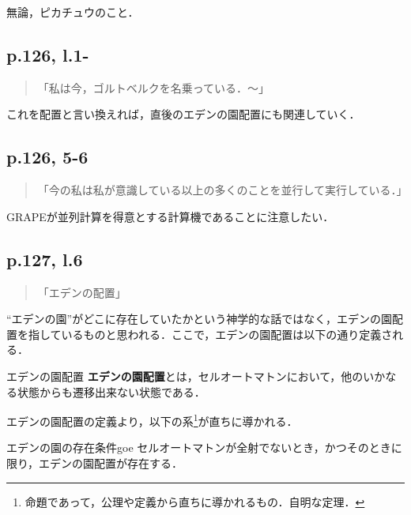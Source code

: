\documentclass[10pt, a5paper, twoside]{ltjsarticle}
\begin{document}
            無論，ピカチュウのこと．

        \subsection{p.126, l.1-}

            \begin{quote}
                「私は今，ゴルトベルクを名乗っている．〜」
            \end{quote}

            これを配置と言い換えれば，直後のエデンの園配置にも関連していく．

        \subsection{p.126, 5-6}

            \begin{quote}
                「今の私は私が意識している以上の多くのことを並行して実行している．」
            \end{quote}

            GRAPEが並列計算を得意とする計算機であることに注意したい．

        \subsection{p.127, l.6}\label{eden}

            \begin{quote}
                「エデンの配置」
            \end{quote}

            “エデンの園”がどこに存在していたかという神学的な話ではなく，エデンの園配置を指しているものと思われる．ここで，エデンの園配置は以下の通り定義される．

            \begin{dfn}{エデンの園配置}{}
                \textbf{エデンの園配置}とは，セルオートマトンにおいて，他のいかなる状態からも遷移出来ない状態である．
            \end{dfn}

            エデンの園配置の定義より，以下の系\footnote{命題であって，公理や定義から直ちに導かれるもの．自明な定理．}が直ちに導かれる\cite{eden}．

            \begin{sys}{エデンの園の存在条件}{goe}
                セルオートマトンが全射でないとき，かつそのときに限り，エデンの園配置が存在する．
            \end{sys}
\end{document}
